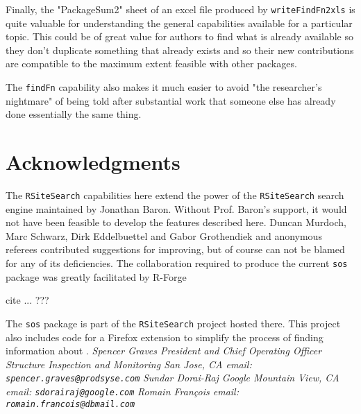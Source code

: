 Finally, the "PackageSum2" sheet of an excel file produced by 
{\tt writeFindFn2xls} is quite valuable for understanding the 
general capabilities available for a particular topic.  
This could be of great value for authors to find what is already 
available so they don't duplicate something that already exists 
and so their new contributions are compatible to the maximum extent
feasible with other packages.  

The {\tt findFn} capability also makes it much easier 
to avoid "the researcher's nightmare" of being told after 
substantial work that someone else has already done essentially 
the same thing.  


\section*{Acknowledgments}
The {\tt RSiteSearch} capabilities here extend the power of the
{\tt RSiteSearch} search engine maintained by Jonathan Baron.
Without Prof. Baron's support, it would not have been feasible
to develop the features described here.  Duncan Murdoch, Marc Schwarz,
Dirk Eddelbuettel and Gabor Grothendiek and anonymous
referees contributed suggestions for improving, but of course
can not be blamed for any of its deficiencies.  The collaboration
required to produce the current {\tt sos} package was greatly
facilitated by R-Forge

cite ... ???


The {\tt sos} package is part of the {\tt RSiteSearch} project
hosted there.  This project also includes code for a Firefox
extension to simplify the process of finding information about
\R{}.
\newline \newline
\emph{Spencer Graves \newline
President and Chief Operating Officer \newline
Structure Inspection and Monitoring \newline
San Jose, CA \newline
email:  {\tt spencer.graves@prodsyse.com} }
\newline \newline
\emph{Sundar Dorai-Raj \newline
Google \newline
Mountain View, CA \newline
email:  {\tt sdorairaj@google.com} }
\newline \newline
\emph{Romain Fran{\c c}ois \newline
\newline
\newline
email:  {\tt romain.francois@dbmail.com} }

